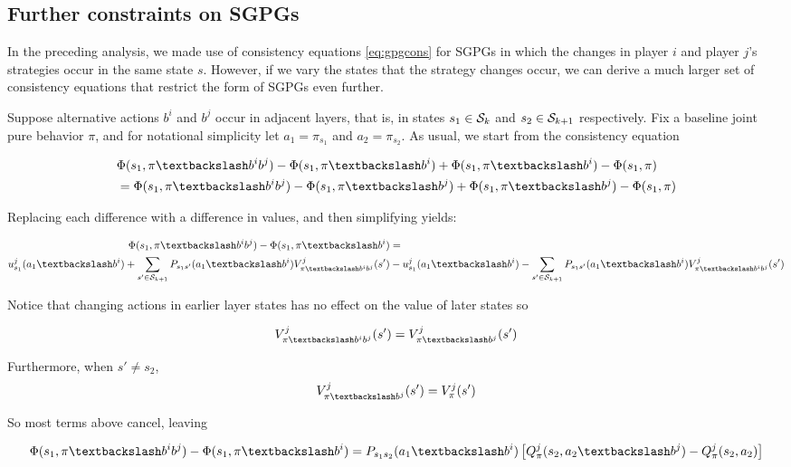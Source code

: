 \subsection{Further constraints on SGPGs}

In the preceding analysis, we made use of consistency equations \ref{eq:gpgcons} for SGPGs in which the changes in player $i$ and player $j$'s strategies occur in the same state $s$. However, if we vary the states that the strategy changes occur, we can derive a much larger set of consistency equations that restrict the form of SGPGs even further. 

Suppose alternative actions $b^i$ and $b^j$ occur in adjacent layers, that is, in states $s_1 \in \mathcal{S}_k$ and $s_2 \in \mathcal{S}_{k+1}$ respectively. Fix a baseline joint pure behavior $\pi$, and for notational simplicity let $a_1 = \pi_{s_1}$ and $a_2 = \pi_{s_2}$. As usual, we start from the consistency equation

\begin{align*}
&\Phi(s_1,\asub{\pi}{b^ib^j}) - \Phi(s_1,\asub{\pi}{b^i}) + \Phi(s_1,\asub{\pi}{b^i}) -
\Phi(s_1,\pi) \\
& = \Phi(s_1,\asub{\pi}{b^ib^j}) - \Phi(s_1,\asub{\pi}{b^j}) + \Phi(s_1,\asub{\pi}{b^j}) -
\Phi(s_1,\pi)
\end{align*}

Replacing each difference with a difference in values, and then simplifying yields:

\begin{align*}
\Phi(s_1,\asub{\pi}{b^ib^j}) - \Phi(s_1,\asub{\pi}{b^i}) & = \\
 u^j_{s_1}(\asub{a_1}{b^i}) + \sum_{s' \in \SS_{k+1}} P_{s_1s'}(\asub{a_1}{b^i})V^j_{\asub{\pi}{b^ib^j}}(s') & - u^j_{s_1}(\asub{a_1}{b^i}) - \sum_{s' \in \SS_{k+1}} P_{s_1s'}(\asub{a_1}{b^i})V^j_{\asub{\pi}{b^ib^j}}(s')
\end{align*}

Notice that changing actions in earlier layer states has no effect on the value of later states so 

$$
V^j_{\asub{\pi}{b^ib^j}}(s') = V^j_{\asub{\pi}{b^j}}(s')
$$

Furthermore, when $s' \neq s_2$, 
$$
V^j_{\asub{\pi}{b^j}}(s') = V^j_{\pi}(s')
$$

So most terms above cancel, leaving

$$
\Phi(s_1,\asub{\pi}{b^ib^j}) - \Phi(s_1,\asub{\pi}{b^i}) = P_{s_1s_2}(\asub{a_1}{b^i}) \left[Q^j_{\pi}(s_2, \asub{a_2}{b^j}) - Q^j_{\pi}(s_2, a_2)\right]
$$

